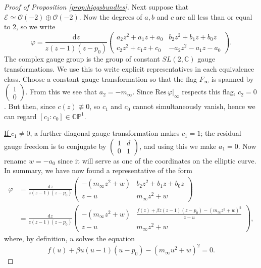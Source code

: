 \documentclass[12pt,letterpaper,reqno]{amsart}
\theoremstyle{remark}
\theoremstyle{definition}
\numberwithin{thm}{section}
\numberwithin{equation}{section}
\numberwithin{figure}{section}
\newcommand{\cO}{\ensuremath{\mathcal O}}
\newcommand{\C}{\ensuremath{\mathbb C}}
\newcommand{\CP}{\ensuremath{\mathbb {CP}}}
\newcommand{\cE}{{\mathcal E}}
\newcommand{\de}{\mathrm{d}}
\begin{document}
\begin{proof}[Proof of Proposition \ref{prop:higgsbundles}]
Next suppose that $\cE \simeq \cO(-2) \oplus \cO(-2)$.  Now the degrees of $a, b$ and $c$ are all less than or equal to $2$, so we write
\begin{equation}
\varphi = \frac{\de z}{z(z-1)(z-p_0)}\begin{pmatrix} a_2 z^2 + a_1 z + a_0 & b_2 z^2 + b_1 z + b_0 z \\ c_2 z^2 + c_1 z + c_0 & - a_2 z^2 - a_1 z - a_0 \end{pmatrix}.
\end{equation}
The complex gauge group is the group of constant $SL(2,\C)$ gauge transformations. We use this to write explicit representatives in each equivalence class. 
Choose a constant gauge transformation so that the flag $F_\infty$ is spanned by $\begin{pmatrix} 1\\ 0 \end{pmatrix}$.  From this we see that $a_2=-m_\infty$. 
Since $\left.\mathrm{Res}\,\varphi\right|_\infty$ respects this flag, $c_2=0$. But then, since $c(z) \not\equiv 0$, so $c_1$ and $c_0$ cannot simultaneously vanish,
hence we can regard $[c_1:c_0] \in \CP^1$.

\smallskip

\noindent \underline{If $c_1 \neq 0$}, a further diagonal gauge transformation makes $c_1=1$; the residual gauge freedom is to conjugate by 
$\begin{pmatrix} 1 & d \\ 0 & 1 \end{pmatrix}$, and using this we make $a_1=0$.  Now rename $w=-a_0$ since it will serve as one of the coordinates 
on the elliptic curve. In summary, we have now found a representative of the form 
\begin{align*}
 \varphi &= \frac{\de z}{z(z-1)(z-p_0)}\begin{pmatrix}  -(m_\infty z^2 + w) & b_2 z^2 + b_1 z + b_0 z \\  z-u & m_\infty z^2  + w \end{pmatrix}\\
& = \frac{\de z}{z(z-1)(z-p_0)}\begin{pmatrix}  -(m_\infty z^2 + w)  & \frac{f(z) + \beta z (z-1)(z-p_0) - (m_\infty z^2 + w)^2}{z-u} \\  z-u & m_\infty z^2  + w  \end{pmatrix},
\end{align*}
where, by definition, $u$ solves the equation
\begin{equation}
f(u) + \beta u (u-1)(u-p_0) - (m_\infty u^2 + w)^2=0.
\end{equation}


\end{proof}
\end{document}
